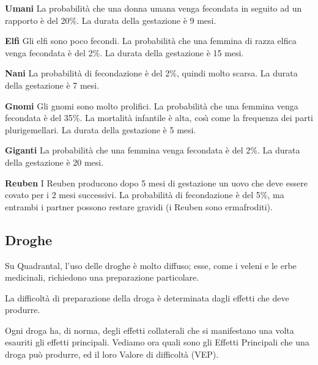 \begin{description}
\item{\bf Umani} La probabilit\`a che una donna umana venga fecondata
  in seguito ad un rapporto \`e del 20\%. La durata della gestazione
  \`e 9 mesi.
\item{\bf Elfi} Gli elfi sono poco fecondi. La probabilit\`a che una
  femmina di razza elfica venga fecondata \`e del 2\%. La durata della
  gestazione \`e 15 mesi.
\item{\bf Nani} La probabilit\`a di fecondazione \`e del 2\%, quindi
  molto scarsa. La durata della gestazione \`e 7 mesi.
\item{\bf Gnomi} Gli gnomi sono molto prolifici. La probabilit\`a che
  una femmina venga fecondata \`e del 35\%. La mortalit\`a infantile
  \`e alta, cos\`{\i} come la frequenza dei parti plurigemellari. La
  durata della gestazione \`e 5 mesi.
\item{\bf Giganti} La probabilit\`a che una femmina venga fecondata
  \`e del 2\%. La durata della gestazione \`e 20 mesi.
\item{\bf Reuben} I Reuben producono dopo 5 mesi di gestazione un uovo
  che deve essere covato per i 2 mesi successivi. La probabilit\`a di
  fecondazione \`e del 5\%, ma entrambi i partner possono restare
  gravidi (i Reuben sono ermafroditi).
\end{description}

\subsection{Droghe}
\label{droghe}
  
Su Quadrantal, l'uso delle droghe \`e molto diffuso; esse, come i
veleni e le erbe medicinali, richiedono una preparazione particolare.

La difficolt\`a di preparazione della droga \`e determinata dagli
effetti che deve produrre.

Ogni droga ha, di norma, degli
effetti collaterali che si manifestano una volta esauriti gli effetti
principali. Vediamo ora quali sono gli Effetti Principali che una
droga pu\`o produrre, ed il loro Valore di difficolt\`a (VEP).

